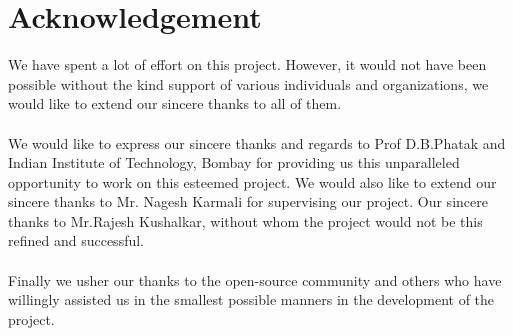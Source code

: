 \documentclass[12pt]{article}
\begin{document}
\setcounter{page}{1}

\listoffigures

\pagebreak

\listoftables

\pagebreak

\tableofcontents

\pagebreak

\setcounter{page}{1}

\section{Acknowledgement}
We have spent a lot of effort on this project. However, it would not have been possible without the kind support of various individuals and organizations, we would like to extend our sincere thanks to all of them.
\\
\\
We would like to express our sincere thanks and regards to Prof D.B.Phatak and Indian Institute of Technology, Bombay for providing us this unparalleled opportunity to work on this esteemed project. We would also like to extend our sincere thanks to Mr. Nagesh Karmali for supervising our project. Our sincere thanks to Mr.Rajesh Kushalkar, without whom the project would not be this refined and successful.
\\ 
\\
Finally we usher our thanks to the open-source community and others who have willingly assisted us in the smallest possible manners in the development of the project.

\pagebreak

\end{document}
